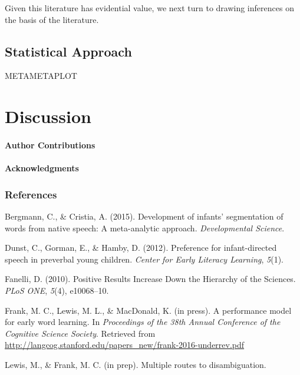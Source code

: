 \documentclass[american,floatsintext,man]{apa6}
\newcounter{author}
\begin{document}
Given this literature has evidential value, we next turn to drawing
inferences on the basis of the literature.

\subsection{Statistical Approach}\label{statistical-approach}

METAMETAPLOT

\section{Discussion}\label{discussion}

\paragraph{Author Contributions}\label{author-contributions}

\paragraph{Acknowledgments}\label{acknowledgments}

\newpage

\subsubsection{References}\label{references}

\setlength{\parindent}{-0.5in} \setlength{\leftskip}{0.5in}
\setlength{\parskip}{8pt}

Bergmann, C., \& Cristia, A. (2015). Development of infants'
segmentation of words from native speech: A meta-analytic approach.
\emph{Developmental Science}.

Dunst, C., Gorman, E., \& Hamby, D. (2012). Preference for
infant-directed speech in preverbal young children. \emph{Center for
Early Literacy Learning}, \emph{5}(1).

Fanelli, D. (2010). Positive Results Increase Down the Hierarchy of the
Sciences. \emph{PLoS ONE}, \emph{5}(4), e10068--10.

Frank, M. C., Lewis, M. L., \& MacDonald, K. (in press). A performance
model for early word learning. In \emph{Proceedings of the 38th Annual
Conference of the Cognitive Science Society}. Retrieved from
\url{http://langcog.stanford.edu/papers_new/frank-2016-underrev.pdf}

Lewis, M., \& Frank, M. C. (in prep). Multiple routes to disambiguation.
\end{document}
